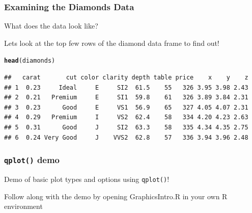 \documentclass{beamer}\usepackage[]{graphicx}\usepackage[]{color}
\makeatletter
\newcommand{\hlstd}[1]{\textcolor[rgb]{0.345,0.345,0.345}{#1}}%
\newcommand{\hlkwd}[1]{\textcolor[rgb]{0.737,0.353,0.396}{\textbf{#1}}}%
\newenvironment{kframe}{%
 \def\at@end@of@kframe{}%
 \ifinner\ifhmode%
  \def\at@end@of@kframe{\end{minipage}}%
  \begin{minipage}{\columnwidth}%
 \fi\fi%
 \def\FrameCommand##1{\hskip\@totalleftmargin \hskip-\fboxsep
 \colorbox{shadecolor}{##1}\hskip-\fboxsep
     \hskip-\linewidth \hskip-\@totalleftmargin \hskip\columnwidth}%
 \MakeFramed {\advance\hsize-\width
   \@totalleftmargin\z@ \linewidth\hsize
   \@setminipage}}%
 {\par\unskip\endMakeFramed%
 \at@end@of@kframe}
\newenvironment{knitrout}{}{} %
\makeatother
\begin{document}
\begin{frame}[fragile]
\frametitle{Examining the Diamonds Data}
    
What does the data look like?\bigskip

Lets look at the top few rows of the diamond data frame to find out!
    
\footnotesize
\begin{knitrout}\scriptsize
{}\color{fgcolor}\begin{kframe}
\begin{alltt}
\hlkwd{head}\hlstd{(diamonds)}
\end{alltt}
\begin{verbatim}
##   carat       cut color clarity depth table price    x    y    z
## 1  0.23     Ideal     E     SI2  61.5    55   326 3.95 3.98 2.43
## 2  0.21   Premium     E     SI1  59.8    61   326 3.89 3.84 2.31
## 3  0.23      Good     E     VS1  56.9    65   327 4.05 4.07 2.31
## 4  0.29   Premium     I     VS2  62.4    58   334 4.20 4.23 2.63
## 5  0.31      Good     J     SI2  63.3    58   335 4.34 4.35 2.75
## 6  0.24 Very Good     J    VVS2  62.8    57   336 3.94 3.96 2.48
\end{verbatim}
\end{kframe}
\end{knitrout}
\normalsize
\end{frame}


\begin{frame}
\frametitle{\texttt{qplot()} demo}

   Demo of basic plot types and options using \texttt{qplot()}!
   
   \vspace{.2in}
   
   Follow along with the demo by opening GraphicsIntro.R in your own R environment

\end{frame}

\end{document}
